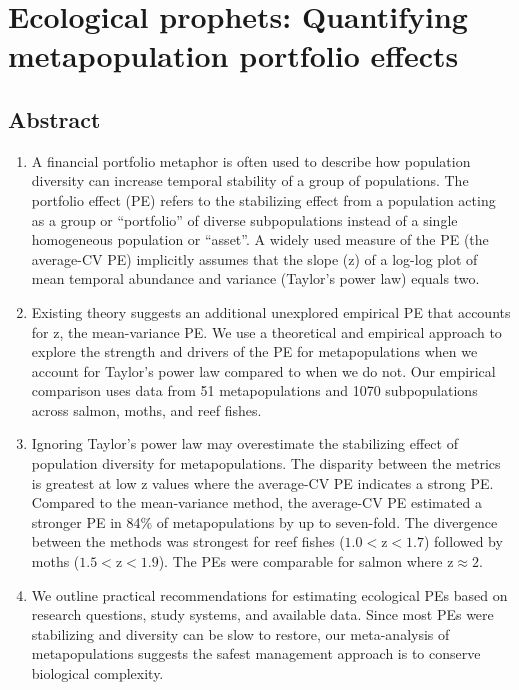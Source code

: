 \chapter[Quantifying metapopulation portfolio effects]{Ecological
  prophets: Quantifying metapopulation portfolio effects\footnotemark{}}

\section{Abstract}
\begin{enumerate}
 \item A financial portfolio metaphor is often used to describe how population
   diversity can increase temporal stability of a group of populations. The
   portfolio effect (PE) refers to the stabilizing effect from a population
   acting as a group or ``portfolio'' of diverse subpopulations instead of a
   single homogeneous population or ``asset''. A widely used measure of the PE
   (the average-CV PE) implicitly assumes that the slope (z) of a log-log plot
   of mean temporal abundance and variance (Taylor's power law) equals two.

 \item Existing theory suggests an additional unexplored empirical PE that
   accounts for z, the mean-variance PE. We use a theoretical and empirical
   approach to explore the strength and drivers of the PE for metapopulations
   when we account for Taylor's power law compared to when we do not. Our
   empirical comparison uses data from 51 metapopulations and
   1070 subpopulations across salmon, moths, and reef fishes.

 \item Ignoring Taylor's power law may overestimate the stabilizing effect of
   population diversity for metapopulations. The disparity between the metrics
   is greatest at low z values where the average-CV PE indicates a strong PE.
   Compared to the mean-variance method, the average-CV PE estimated a stronger
   PE in 84\% of metapopulations by up to seven-fold. The divergence between
   the methods was strongest for reef fishes ($1.0 < \text{z} < 1.7$) followed
   by moths ($1.5 < \text{z} < 1.9$). The PEs were comparable for salmon where
   $\text{z} \approx 2$.

 \item We outline practical recommendations for estimating ecological PEs based
   on research questions, study systems, and available data. Since most PEs
   were stabilizing and diversity can be slow to restore, our meta-analysis of
   metapopulations suggests the safest management approach is to conserve
   biological complexity.

\end{enumerate}

